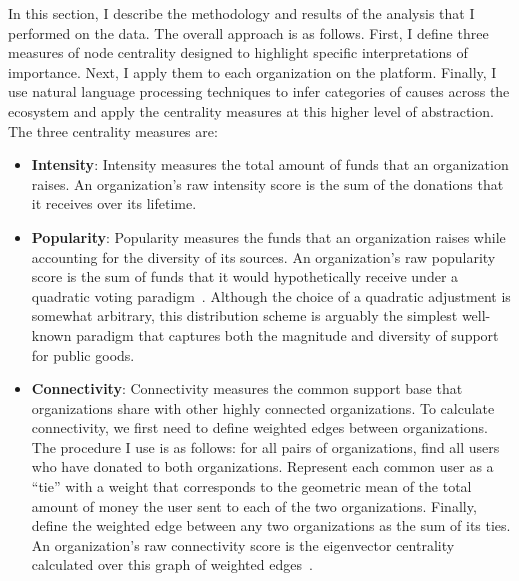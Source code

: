 In this section, I describe the methodology and results of the analysis that I performed on the data.
The overall approach is as follows.
First, I define three measures of node centrality designed to highlight specific interpretations of importance.
Next, I apply them to each organization on the platform.
Finally, I use natural language processing techniques to infer categories of causes across the ecosystem and apply the centrality measures at this higher level of abstraction.
The three centrality measures are:

\begin{itemize}
  \item \textbf{Intensity}: Intensity measures the total amount of funds that an organization raises.
    An organization's raw intensity score is the sum of the donations that it receives over its lifetime.

  \item \textbf{Popularity}: Popularity measures the funds that an organization raises while accounting for the diversity of its sources.
    An organization's raw popularity score is the sum of funds that it would hypothetically receive under a quadratic voting paradigm~\cite{lalley2018quadratic}.
    Although the choice of a quadratic adjustment is somewhat arbitrary, this distribution scheme is arguably the simplest well-known paradigm that captures both the magnitude and diversity of support for public goods.

  \item \textbf{Connectivity}: Connectivity measures the common support base that organizations share with other highly connected organizations.
    To calculate connectivity, we first need to define weighted edges between organizations.
    The procedure I use is as follows: for all pairs of organizations, find all users who have donated to both organizations.
    Represent each common user as a ``tie'' with a weight that corresponds to the geometric mean of the total amount of money the user sent to each of the two organizations.
    Finally, define the weighted edge between any two organizations as the sum of its ties.
    An organization's raw connectivity score is the eigenvector centrality calculated over this graph of weighted edges~\cite{hagberg2008exploring}.

\end{itemize}

